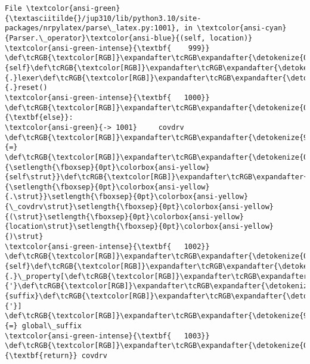 \documentclass[landscape,letterpaper,10pt,english]{article}
\begin{document}
\begin{Verbatim}[commandchars=\\\{\}, frame=single, framerule=2mm, rulecolor=\color{outerrorbackground}]
File \textcolor{ansi-green}{\textasciitilde{}/jup310/lib/python3.10/site-packages/nrpylatex/parse\_latex.py:1001}, in \textcolor{ansi-cyan}{Parser.\_operator}\textcolor{ansi-blue}{(self, location)}
\textcolor{ansi-green-intense}{\textbf{    999}}     \def\tcRGB{\textcolor[RGB]}\expandafter\tcRGB\expandafter{\detokenize{0,135,0}}{self}\def\tcRGB{\textcolor[RGB]}\expandafter\tcRGB\expandafter{\detokenize{98,98,98}}{.}lexer\def\tcRGB{\textcolor[RGB]}\expandafter\tcRGB\expandafter{\detokenize{98,98,98}}{.}reset()
\textcolor{ansi-green-intense}{\textbf{   1000}} \def\tcRGB{\textcolor[RGB]}\expandafter\tcRGB\expandafter{\detokenize{0,135,0}}{\textbf{else}}:
\textcolor{ansi-green}{-> 1001}     covdrv \def\tcRGB{\textcolor[RGB]}\expandafter\tcRGB\expandafter{\detokenize{98,98,98}}{=} \def\tcRGB{\textcolor[RGB]}\expandafter\tcRGB\expandafter{\detokenize{0,135,0}}{\setlength{\fboxsep}{0pt}\colorbox{ansi-yellow}{self\strut}}\def\tcRGB{\textcolor[RGB]}\expandafter\tcRGB\expandafter{\detokenize{98,98,98}}{\setlength{\fboxsep}{0pt}\colorbox{ansi-yellow}{.\strut}}\setlength{\fboxsep}{0pt}\colorbox{ansi-yellow}{\_covdrv\strut}\setlength{\fboxsep}{0pt}\colorbox{ansi-yellow}{(\strut}\setlength{\fboxsep}{0pt}\colorbox{ansi-yellow}{location\strut}\setlength{\fboxsep}{0pt}\colorbox{ansi-yellow}{)\strut}
\textcolor{ansi-green-intense}{\textbf{   1002}}     \def\tcRGB{\textcolor[RGB]}\expandafter\tcRGB\expandafter{\detokenize{0,135,0}}{self}\def\tcRGB{\textcolor[RGB]}\expandafter\tcRGB\expandafter{\detokenize{98,98,98}}{.}\_property[\def\tcRGB{\textcolor[RGB]}\expandafter\tcRGB\expandafter{\detokenize{175,0,0}}{'}\def\tcRGB{\textcolor[RGB]}\expandafter\tcRGB\expandafter{\detokenize{175,0,0}}{suffix}\def\tcRGB{\textcolor[RGB]}\expandafter\tcRGB\expandafter{\detokenize{175,0,0}}{'}] \def\tcRGB{\textcolor[RGB]}\expandafter\tcRGB\expandafter{\detokenize{98,98,98}}{=} global\_suffix
\textcolor{ansi-green-intense}{\textbf{   1003}}     \def\tcRGB{\textcolor[RGB]}\expandafter\tcRGB\expandafter{\detokenize{0,135,0}}{\textbf{return}} covdrv


\end{Verbatim}
\end{document}
